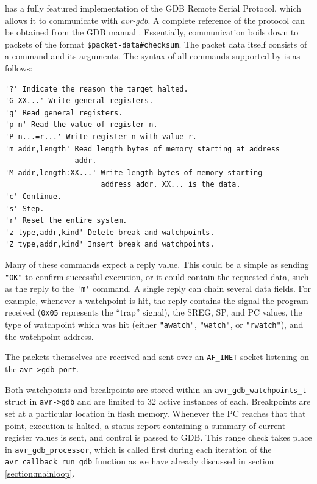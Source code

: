 \simavr has a fully featured implementation of the \ac{GDB} Remote Serial Protocol,
which allows it to communicate with \emph{avr-gdb}. A complete reference of
the protocol can be obtained from the \ac{GDB} manual \cite{gdb}. Essentially,
communication boils down to packets of the format \lstinline|$packet-data#checksum|.
The packet data itself consists of a command and its arguments. The syntax of
all commands supported by \simavr is as follows:

\begin{Verbatim}[samepage=true]
'?' Indicate the reason the target halted.
'G XX...' Write general registers.
'g' Read general registers.
'p n' Read the value of register n.
'P n...=r...' Write register n with value r.
'm addr,length' Read length bytes of memory starting at address
                addr.
'M addr,length:XX...' Write length bytes of memory starting
                      address addr. XX... is the data.
'c' Continue.
's' Step.
'r' Reset the entire system.
'z type,addr,kind' Delete break and watchpoints.
'Z type,addr,kind' Insert break and watchpoints.
\end{Verbatim}

Many of these commands expect a reply value. This could be a simple as sending
\verb|"OK"| to confirm successful execution, or it could contain the requested
data, such as the reply to the \verb|'m'| command. A single reply can chain
several data fields. For example, whenever a watchpoint is hit, the reply contains
the signal the program received (\lstinline|0x05| represents the ``trap'' signal),
the \ac{SREG}, \ac{SP}, and \ac{PC} values, the type of watchpoint which was hit
(either \verb|"awatch"|, \verb|"watch"|, or \verb|"rwatch"|), and the watchpoint
address.

The packets themselves are received and sent over an \lstinline|AF_INET| socket listening
on the \lstinline|avr->gdb_port|.

Both watchpoints and breakpoints are stored within an \lstinline|avr_gdb_watchpoints_t|
struct in \lstinline|avr->gdb| and are limited to 32 active instances of each.
Breakpoints are set at a particular location in flash memory. Whenever the \ac{PC}
reaches that that point, execution is halted, a status report containing a summary
of current register values is sent, and control is passed to \ac{GDB}. This
range check takes place in \lstinline|avr_gdb_processor|, which is called
first during each iteration of the \lstinline|avr_callback_run_gdb| function
as we have already discussed in section \ref{section:mainloop}.

